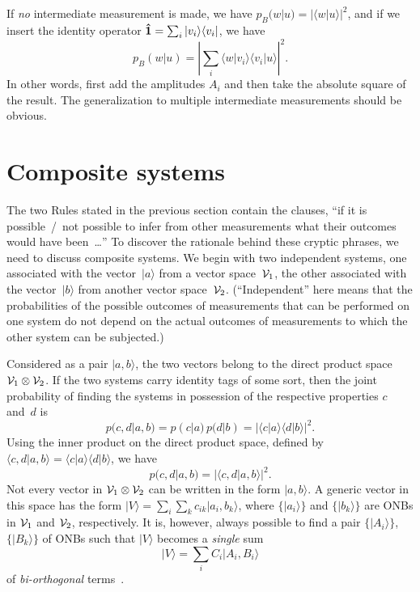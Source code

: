 \documentclass[12pt]{article}
\newcommand{\ket}[1]{\vert#1\rangle}
\newcommand{\braket}[2]{\langle#1\vert#2\rangle}
\newcommand{\ketbra}[2]{\vert#1\rangle\langle#2\vert}
\newcommand{\be}{\begin{equation}}
\newcommand{\ee}{\end{equation}}
\newcommand{\hI}{{\bf\hat 1}}
\begin{document}
If \textit{no} intermediate measurement is made, we have $p_B(w|u)=|\braket wu|^2$, and if we insert the identity operator $\hI=\sum_i\ketbra{v_i}{v_i}$, we have
\be
p_B(w|u)=\left|{\textstyle\sum_i}\braket w{v_i}\braket{v_i}u\right|^2.
\ee
In other words, first add the amplitudes $A_i$ and then take the absolute square of the result. The generalization to multiple intermediate measurements should be obvious.

\section{Composite systems}
\label{SecCompSyss}The two Rules stated in the previous section contain the clauses, ``if it is possible~/~not possible to infer from other measurements what their outcomes would have been~\dots'' To discover the rationale behind these cryptic phrases, we need to discuss composite systems. We begin with two independent systems, one associated with the vector~$\ket a$ from a vector space~${\cal V}_1$, the other associated with the vector~$\ket b$ from another vector space~${\cal V}_2$.  (``Independent'' here means that the probabilities of the possible outcomes of measurements that can be performed on one system do not depend on the actual outcomes of measurements to which the other system can be subjected.)

Considered as a pair $\ket{a,b}$, the two vectors belong to the direct product space ${\cal V}_1\otimes{\cal V}_2$. If the two systems carry identity tags of some sort, then the joint probability of finding the systems in possession of the respective properties $c$ and~$d$ is
\be
p(c,d|a,b)=p(c|a)\,p(d|b)=|\braket ca\braket db|^2.
\ee
Using the inner product on the direct product space, defined by $\braket{c,d}{a,b}=\braket ca\braket db$, we have
\be
p(c,d|a,b)=|\braket{c,d}{a,b}|^2.
\ee
Not every vector in ${\cal V}_1\otimes{\cal V}_2$ can be written in the form $\ket{a,b}$. A generic vector in this space has the form $\ket V=\sum_i\sum_k c_{ik}\ket{a_i,b_k}$, where $\{\ket{a_i}\}$ and $\{\ket{b_k}\}$ are ONBs in ${\cal V}_1$ and ${\cal V}_2$, respectively. It is, however, always possible to find a pair $\{\ket{A_i}\}$, $\{\ket{B_k}\}$ of ONBs such that $\ket V$ becomes a \textit{single} sum
\be
\ket V=\sum_i C_i\ket{A_i,B_i}
\label{EQbiorth}
\ee
of \textit{bi-orthogonal} terms~\cite{Peres5-3}.
\end{document}
